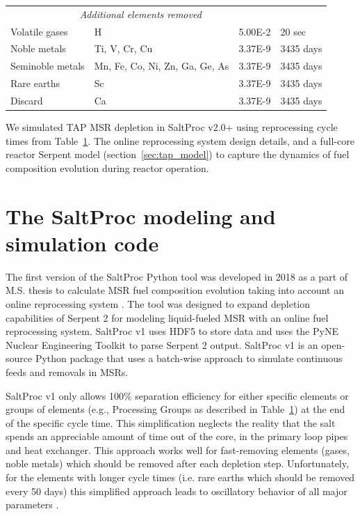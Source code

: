 \documentclass[12pt]{article} %
\begin{document}
\begin{table}[ht!]
\begin{tabular}{p{} p{} p{} p{}}
 \multicolumn{3}{c}{\textit{Additional elements removed} \cite{transatomic_power_corporation_neutronics_2016, betzler_implementation_2017}  } \\
        Volatile gases & H								  	& 5.00E-2 & 20 sec    \\ [5pt]
        Noble metals & Ti, V, Cr, Cu						& 3.37E-9 & 3435 days \\ [5pt]
        Seminoble metals & Mn, Fe, Co, Ni, Zn, Ga, Ge, As   & 3.37E-9 & 3435 days \\ [5pt]
        Rare earths & Sc									& 3.37E-9 & 3435 days \\ [5pt]
        Discard & Ca										& 3.37E-9 & 3435 days \\ [5pt] 
        \hline
        \end{tabular}
        \label{tab:reprocessing_list}
          \vspace{-0.9em}
\end{table}

We simulated \gls{TAP} \gls{MSR} depletion in SaltProc v2.0+ using  
reprocessing cycle times from Table~\ref{tab:reprocessing_list}. The online 
reprocessing system design details, and a full-core reactor Serpent model 
(section~\ref{sec:tap_model}) to capture the dynamics of fuel composition 
evolution during reactor operation.

\section{The SaltProc modeling and simulation code} \label{sec:tool}
The first version of the SaltProc Python tool was developed in 2018 as a part 
of M.S. thesis to calculate \gls{MSR} fuel composition evolution taking into 
account an online reprocessing system \cite{rykhlevskii_advanced_2018,
rykhlevskii_arfc/saltproc_2018}. The tool was designed to expand depletion 
capabilities of Serpent 2 for modeling liquid-fueled \gls{MSR} with an online 
fuel reprocessing system. SaltProc v1 uses HDF5  
\cite{the_hdf_group_hierarchical_1997} to store data and uses the PyNE Nuclear 
Engineering Toolkit \cite{scopatz_pyne_2012} to parse Serpent 2 output. 
SaltProc v1 is an open-source Python package that uses a batch-wise approach 
to simulate continuous feeds and removals in \glspl{MSR}. 

SaltProc v1 only allows 100\% separation efficiency for either specific 
elements or groups of elements (e.g., Processing Groups as described in 
Table~\ref{tab:reprocessing_list}) at the end of the specific cycle time. This 
simplification neglects the reality that the salt spends an appreciable amount 
of time out of the core, in the primary loop pipes and heat exchanger. This 
approach works well for fast-removing elements (gases, noble metals) which 
should be removed after each depletion step. Unfortunately, for the elements 
with longer cycle times (i.e. rare earths which should be removed every 50 
days) this simplified approach leads to oscillatory behavior of all major 
parameters \cite{rykhlevskii_modeling_2019}. 
\end{document}
